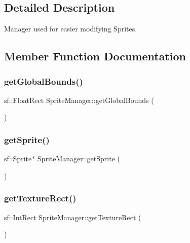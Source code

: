 \subsection{Detailed Description}
Manager used for easier modifying Sprites. 

\subsection{Member Function Documentation}
\mbox{\label{class_sprite_manager_af4b1373fb34c1bf091e5023fe52c1bc0}} 
\subsubsection{\texorpdfstring{getGlobalBounds()}{getGlobalBounds()}}
{\footnotesize\ttfamily sf\+::\+Float\+Rect Sprite\+Manager\+::get\+Global\+Bounds (\begin{DoxyParamCaption}{ }\end{DoxyParamCaption})\hspace{0.3cm}{\ttfamily [inline]}}

\mbox{\label{class_sprite_manager_a9c0af555f22c9ea83a07ae3d1818db0e}} 
\subsubsection{\texorpdfstring{getSprite()}{getSprite()}}
{\footnotesize\ttfamily sf\+::\+Sprite$\ast$ Sprite\+Manager\+::get\+Sprite (\begin{DoxyParamCaption}{ }\end{DoxyParamCaption})\hspace{0.3cm}{\ttfamily [inline]}}

\mbox{\label{class_sprite_manager_af51994d0f3a5e847a8c55bb022f8b1e2}} 
\subsubsection{\texorpdfstring{getTextureRect()}{getTextureRect()}}
{\footnotesize\ttfamily sf\+::\+Int\+Rect Sprite\+Manager\+::get\+Texture\+Rect (\begin{DoxyParamCaption}{ }\end{DoxyParamCaption})\hspace{0.3cm}{\ttfamily [inline]}}

